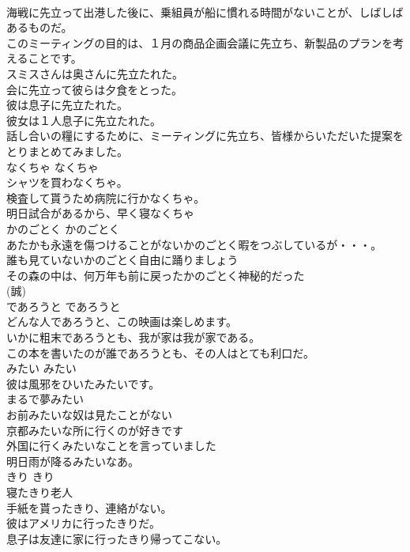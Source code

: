 \documentclass[8pt]{extreport}
\begin{document}
\begin{CJK}{UTF8}{min}
\\	海戦に先立って出港した後に、乗組員が船に慣れる時間がないことが、しばしばあるものだ。   
\\	このミーティングの目的は、１月の商品企画会議に先立ち、新製品のプランを考えることです。   
\\	スミスさんは奥さんに先立たれた。   
\\	会に先立って彼らは夕食をとった。  
\\	彼は息子に先立たれた。   
\\	彼女は１人息子に先立たれた。  
\\	話し合いの糧にするために、ミーティングに先立ち、皆様からいただいた提案をとりまとめてみました。   
\\	なくちゃ	なくちゃ	
\\	シャツを買わなくちゃ。   
\\	検査して貰うため病院に行かなくちゃ。   
\\	明日試合があるから、早く寝なくちゃ   
\\	かのごとく	かのごとく	
\\	あたかも永遠を傷つけることがないかのごとく暇をつぶしているが・・・。  
\\	誰も見ていないかのごとく自由に踊りましょう  
\\	その森の中は、何万年も前に戻ったかのごとく神秘的だった  
\\	(誠)
\\	であろうと	であろうと	
\\	どんな人であろうと、この映画は楽しめます。  
\\	いかに粗末であろうとも、我が家は我が家である。   
\\	この本を書いたのが誰であろうとも、その人はとても利口だ。   
\\	みたい	みたい	
\\	彼は風邪をひいたみたいです。  
\\	まるで夢みたい  
\\	お前みたいな奴は見たことがない  
\\	京都みたいな所に行くのが好きです  
\\	外国に行くみたいなことを言っていました  
\\	明日雨が降るみたいなあ。  
\\	きり	きり	
\\	寝たきり老人  
\\	手紙を貰ったきり、連絡がない。  
\\	彼はアメリカに行ったきりだ。  
\\	息子は友達に家に行ったきり帰ってこない。  

\end{CJK}
\end{document}
